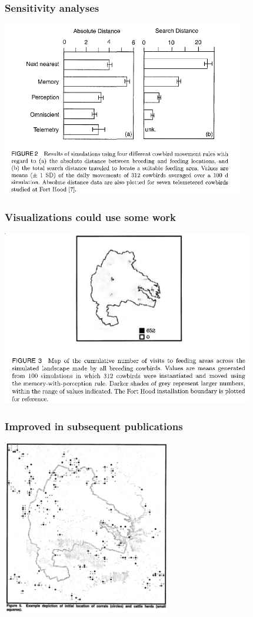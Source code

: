 \documentclass{beamer}
\begin{document}
\begin{frame}
	\frametitle{Sensitivity analyses}
	\begin{center}
		\includegraphics[height=3.0in, keepaspectratio]{fig2.png}
	\end{center}
\end{frame}

\begin{frame}
	\frametitle{Visualizations could use some work}
	\begin{center}
		\includegraphics[height=3.0in, keepaspectratio]{fig3.png}
	\end{center}
\end{frame}
	
\begin{frame}
	\frametitle{Improved in subsequent publications}
	\begin{center}
		\includegraphics[height=3.0in, keepaspectratio]{fig5.png}
	\end{center}
\end{frame}
\end{document}
